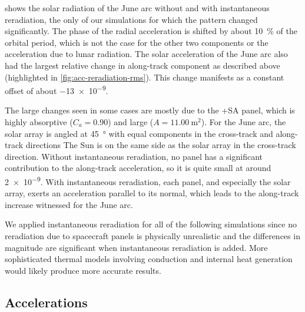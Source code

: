  shows the solar radiation of the June arc without and with instantaneous reradiation, the only of our simulations for which the pattern changed significantly. The phase of the radial acceleration is shifted by about \qty{10}{\percent} of the orbital period, which is not the case for the other two components or the acceleration due to lunar radiation. The solar acceleration of the June arc also had the largest relative change in along-track component as described above (highlighted in \cref{fig:acc-reradiation-rms}). This change manifests as a constant offset of about \qty{-13e-9}{\acc}. 

The large changes seen in some cases are mostly due to the +SA panel, which is highly absorptive ($C_a = 0.90$) and large ($A = \qty{11.00}{\m\squared}$). For the June arc, the solar array is angled at \qty{45}{\degree} with equal components in the cross-track and along-track directions The Sun is on the same side as the solar array in the cross-track direction. Without instantaneous reradiation, no panel has a significant contribution to the along-track acceleration, so it is quite small at around \qty{2e-9}{\acc}. With instantaneous reradiation, each panel, and especially the solar array, exerts an acceleration parallel to its normal, which leads to the along-track increase witnessed for the June arc.

We applied instantaneous reradiation for all of the following simulations since no reradiation due to spacecraft panels is physically unrealistic and the differences in magnitude are significant when instantaneous reradiation is added. More sophisticated thermal models involving conduction and internal heat generation would likely produce more accurate results.











\subsection{Accelerations}
\label{subsec:results-accelerations}

